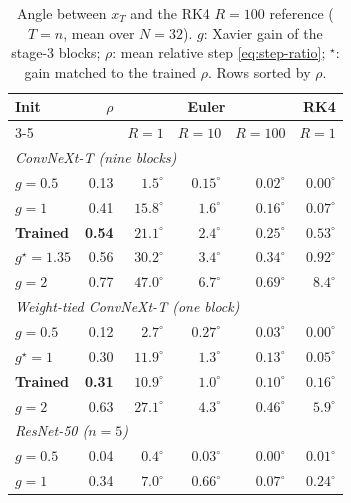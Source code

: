\begin{table}[t]
    \centering
    \caption{Angle between $x_T$ and the RK4 $R{=}100$ reference ($T{=}n$, mean over
    $N{=}32$). $g$: Xavier gain of the stage-3 blocks; $\rho$: mean relative step
    \eqref{eq:step-ratio}; $^\star$: gain matched to the trained $\rho$.
    Rows sorted by $\rho$.}
    \label{tab:app-random-init}
    \small
    \setlength{\tabcolsep}{3pt}
    \begin{tabular}{lrrrrr}
        \toprule
        Init & $\rho$ & \multicolumn{3}{c}{Euler} & RK4 \\
        \cmidrule(lr){3-5}
             &        & $R{=}1$ & $R{=}10$ & $R{=}100$ & $R{=}1$ \\
        \midrule
        \multicolumn{6}{l}{\emph{ConvNeXt-T (nine blocks)}} \\
        $g{=}0.5$  & 0.13 & $1.5^\circ$  & $0.15^\circ$ & $0.02^\circ$ & $0.00^\circ$ \\
        $g{=}1$    & 0.41 & $15.8^\circ$ & $1.6^\circ$  & $0.16^\circ$ & $0.07^\circ$ \\
        \textbf{Trained} & \textbf{0.54} & $\mathbf{21.1^\circ}$ & $\mathbf{2.4^\circ}$ & $\mathbf{0.25^\circ}$ & $\mathbf{0.53^\circ}$ \\
        $g^\star{=}1.35$ & 0.56 & $30.2^\circ$ & $3.4^\circ$ & $0.34^\circ$ & $0.92^\circ$ \\
        $g{=}2$    & 0.77 & $47.0^\circ$ & $6.7^\circ$  & $0.69^\circ$ & $8.4^\circ$ \\
        \midrule
        \multicolumn{6}{l}{\emph{Weight-tied ConvNeXt-T (one block)}} \\
        $g{=}0.5$  & 0.12 & $2.7^\circ$  & $0.27^\circ$ & $0.03^\circ$ & $0.00^\circ$ \\
        $g^\star{=}1$ & 0.30 & $11.9^\circ$ & $1.3^\circ$ & $0.13^\circ$ & $0.05^\circ$ \\
        \textbf{Trained} & \textbf{0.31} & $\mathbf{10.9^\circ}$ & $\mathbf{1.0^\circ}$ & $\mathbf{0.10^\circ}$ & $\mathbf{0.16^\circ}$ \\
        $g{=}2$    & 0.63 & $27.1^\circ$ & $4.3^\circ$  & $0.46^\circ$ & $5.9^\circ$ \\
        \midrule
        \multicolumn{6}{l}{\emph{ResNet-50 ($n{=}5$)}} \\
        $g{=}0.5$  & 0.04 & $0.4^\circ$  & $0.03^\circ$ & $0.00^\circ$ & $0.01^\circ$ \\
        $g{=}1$    & 0.34 & $7.0^\circ$  & $0.66^\circ$ & $0.07^\circ$ & $0.24^\circ$ \\

\end{tabular}
\end{table}
